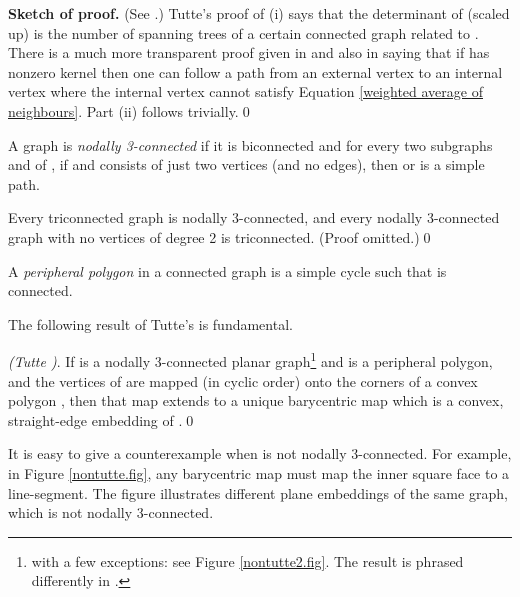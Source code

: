 {\bf Sketch of proof.}
(See \cite{tutte,bsst,floater97,white}.)
Tutte's proof of (i) \cite{tutte,bsst} says that
the determinant of  (scaled up) is the number of spanning trees of
a certain connected graph related to .
There is a much more transparent proof given
in \cite{floater97} and also in \cite{white} saying
that if  has nonzero kernel then one can follow
a path from an external vertex to an internal vertex
where the internal vertex cannot satisfy Equation
\ref{weighted average of neighbours}.
Part (ii) follows trivially.\qed





\begin{definition}
\label{nodal 3-connectivity} A graph  is {\em nodally 3-connected} if it
is biconnected and for every two subgraphs
 and  of , if  and
 consists of just two vertices (and
no edges), then  or  is a simple path.
\end{definition}

\begin{proposition}
\label{nodally 3-connected and no deg 2} Every triconnected graph is nodally 3-connected,
and every nodally 3-connected graph with no vertices
of degree 2 is triconnected. (Proof omitted.)\qed
\end{proposition}

\begin{definition}
\label{peripheral polygon} A {\em peripheral polygon} in a connected graph 
is a simple cycle  such that  is
connected.
\end{definition}

The following result of Tutte's is fundamental.

\begin{proposition}
\label{tutte's theorem} {\em (Tutte \cite{tutte})}. If  is a nodally 3-connected
planar graph\footnote{with a few
exceptions: see Figure \ref{nontutte2.fig}. The result is phrased
differently in \cite{tutte}.}  and  is a peripheral polygon, and
the vertices of  are mapped (in cyclic order) onto the corners of a convex
polygon , then that map extends to a unique barycentric map
which is a convex, straight-edge embedding of .\qed
\end{proposition}

It is easy to give a counterexample when  is not
nodally 3-connected.  For example, in Figure \ref{nontutte.fig},
any barycentric map must map
the inner square face to a line-segment.  The figure
illustrates different plane embeddings of the same
graph, which is not nodally 3-connected.

